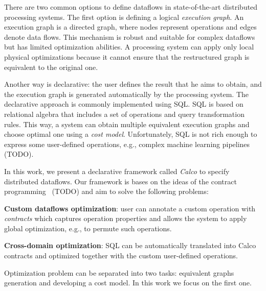 There are two common options to define dataflows in state-of-the-art distributed processing systems.
The first option is defining a logical {\em execution graph}.
An execution graph is a directed graph, where nodes represent operations and edges denote data flows.
This mechanism is robust and suitable for complex dataflows but has limited optimization abilities.
A processing system can apply only local physical optimizations because it cannot ensure that the restructured graph is equivalent to the original one.

Another way is declarative: the user defines the result that he aims to obtain, and the execution graph is generated automatically by the processing system.
The declarative approach is commonly implemented using SQL.
SQL is based on relational algebra that includes a set of operations and query transformation rules.
This way, a system can obtain multiple equivalent execution graphs and choose optimal one using a {\em cost model}.
Unfortunately, SQL is not rich enough to express some user-defined operations, e.g., complex machine learning pipelines~\cite{PROOF} (TODO).

In this work, we present a declarative framework called {\em Calco} to specify distributed dataflows.
Our framework is bases on the ideas of the contract programming~\cite{REF} (TODO) and aim to solve the following problems:

{\bf Custom dataflows optimization}: user can annotate a custom operation with {\em contracts} which captures operation properties and allows the system to apply global optimization, e.g., to permute such operations.

{\bf Cross-domain optimization}: SQL can be automatically translated into Calco contracts and optimized together with the custom user-defined operations.

Optimization problem can be separated into two tasks: equivalent graphs generation and developing a cost model.
In this work we focus on the first one.

